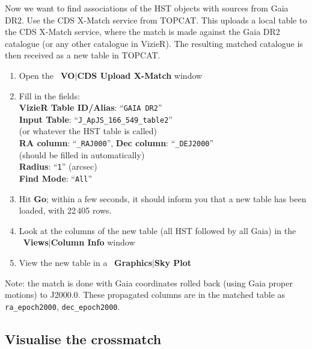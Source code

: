 \documentclass{article}
\newcommand{\buttimg}[1]
           {\mbox{\vtop{\vskip-2ex\hbox{\texttt{[image: \#1]}}}}}
\newcommand{\winfig}[2]
           {\vspace*{-0.5cm}
            \hspace*{0.5cm}\mbox{\vtop{\hbox{\texttt{[image: \#2]}}}}}
\newcommand{\lab}[1]{{\bf #1}}
\newcommand{\mb}[3]{\buttimg{#1}~\lab{#2}$\mid$\lab{#3}}
\newcommand{\entry}[2]{\lab{#1}: ``{\tt #2}''}
\begin{document}
\begin{minipage}[t]{11cm}
  \raggedright
  Now we want to find associations of the HST objects with sources
  from Gaia DR2.
  Use the CDS X-Match service from TOPCAT.
  This uploads a local table to the CDS X-Match service,
  where the match is made against the Gaia DR2 catalogue
  (or any other catalogue in VizieR).
  The resulting matched catalogue is then received as a new
  table in TOPCAT.
  \begin{enumerate}
  \item Open the \mb{xmatch_button.png}{VO}{CDS Upload X-Match} window
  \item Fill in the fields:\\
        \entry{VizieR Table ID/Alias}{GAIA DR2} \\
        \entry{Input Table}{J\_ApJS\_166\_549\_table2} \\
        (or whatever the HST table is called) \\
        \entry{RA column}{\_RAJ000}, \entry{Dec column}{\_DEJ2000}  \\
        (should be filled in automatically) \\
        \entry{Radius}{1} (arcsec) \\
        \entry{Find Mode}{All}
  \item Hit \lab{Go};
        within a few seconds, it should inform you that a new table has been
        loaded, with 22\,405 rows.
  \item Look at the columns of the new table (all HST followed by all Gaia)
        in the \mb{cols_button.png}{Views}{Column Info} window
  \item View the new table in a \mb{skyplot_button.png}{Graphics}{Sky Plot}
  \end{enumerate}
Note: the match is done with Gaia coordinates rolled back
(using Gaia proper motions) to J2000.0.
These propagated columns are in the matched table as
{\tt ra\_epoch2000}, {\tt dec\_epoch2000}.
\end{minipage}
\begin{minipage}[t]{8cm}
  \vspace*{-0.5cm}
  \winfig{width=8cm}{n3_cdsxmatch.png}
\end{minipage}


\subsection{Visualise the crossmatch}
\label{sec:xmatch-plot}
\end{document}
